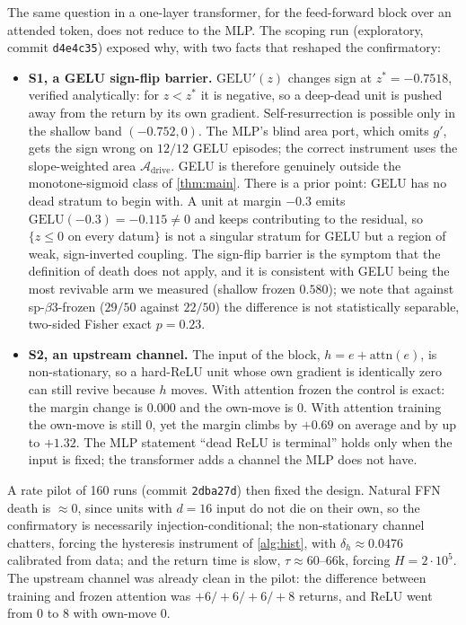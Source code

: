 \documentclass[11pt]{article}
\theoremstyle{definition}
\theoremstyle{remark}
\newcommand{\Ar}{\mathcal{A}}                      %
\begin{document}
The same question in a one-layer transformer, for the feed-forward block over an
attended token, does not reduce to the MLP. The scoping run (exploratory, commit
\texttt{d4e4c35}) exposed why, with two facts that reshaped the confirmatory:

\begin{itemize}
\item \textbf{S1, a GELU sign-flip barrier.} $\mathrm{GELU}'(z)$ changes sign at
$z^\ast=-0.7518$, verified analytically: for $z<z^\ast$ it is negative, so a
deep-dead unit is pushed away from the return by its own gradient.
Self-resurrection is possible only in the shallow band $(-0.752,0)$. The MLP's
blind area port, which omits $g'$, gets the sign wrong on $12/12$ GELU episodes;
the correct instrument uses the slope-weighted area $\Ar_{\mathrm{drive}}$. GELU
is therefore genuinely outside the monotone-sigmoid class of \cref{thm:main}.
There is a prior point: GELU has no dead stratum to begin with. A unit at margin
$-0.3$ emits $\mathrm{GELU}(-0.3)=-0.115\ne0$ and keeps contributing to the
residual, so $\{z\le0$ on every datum$\}$ is not a singular stratum for GELU but
a region of weak, sign-inverted coupling. The sign-flip barrier is the symptom
that the definition of death does not apply, and it is consistent with GELU
being the most revivable arm we measured (shallow frozen $0.580$); we note that
against sp-$\beta3$-frozen ($29/50$ against $22/50$) the difference is not
statistically separable, two-sided Fisher exact $p=0.23$.
\item \textbf{S2, an upstream channel.} The input of the block,
$h=e+\mathrm{attn}(e)$, is non-stationary, so a hard-ReLU unit whose own gradient
is identically zero can still revive because $h$ moves. With attention frozen the
control is exact: the margin change is $0.000$ and the own-move is $0$. With
attention training the own-move is still $0$, yet the margin climbs by $+0.69$ on
average and by up to $+1.32$. The MLP statement ``dead ReLU is terminal'' holds
only when the input is fixed; the transformer adds a channel the MLP does not
have.
\end{itemize}

A rate pilot of 160 runs (commit \texttt{2dba27d}) then fixed the design. Natural
FFN death is $\approx0$, since units with $d=16$ input do not die on their own,
so the confirmatory is necessarily injection-conditional; the non-stationary
channel chatters, forcing the hysteresis instrument of \cref{alg:hist}, with
$\delta_h\approx0.0476$ calibrated from data; and the return time is slow, $\tau\approx60$--$66$k, forcing
$H=2\cdot10^{5}$. The upstream channel was already clean in the pilot: the
difference between training and frozen attention was $+6/+6/+6/+8$ returns, and
ReLU went from $0$ to $8$ with own-move $0$.
\end{document}
